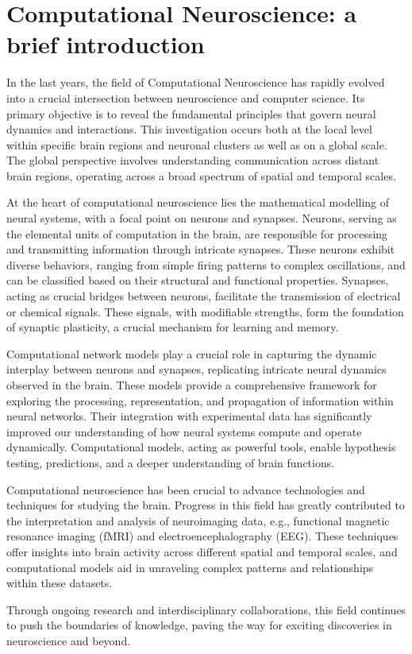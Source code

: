 \documentclass[../main.tex]{subfiles}
\begin{document}
\section{Computational Neuroscience: a brief introduction}
In the last years, the field of Computational Neuroscience has rapidly evolved into a crucial intersection between neuroscience and computer science.
Its primary objective is to reveal the fundamental principles that govern neural dynamics and interactions.
This investigation occurs both at the local level within specific brain regions and neuronal clusters as well as on a global scale.
The global perspective involves understanding communication across distant brain regions, operating across a broad spectrum of spatial and temporal scales.

At the heart of computational neuroscience lies the mathematical modelling of neural systems, with a focal point on neurons and synapses.
Neurons, serving as the elemental units of computation in the brain, are responsible for processing and transmitting information through intricate synapses.
These neurons exhibit diverse behaviors, ranging from simple firing patterns to complex oscillations, and can be classified based on their structural and functional properties.
Synapses, acting as crucial bridges between neurons, facilitate the transmission of electrical or chemical signals.
These signals, with modifiable strengths, form the foundation of synaptic plasticity, a crucial mechanism for learning and memory.

Computational network models play a crucial role in capturing the dynamic interplay between neurons and synapses, replicating intricate neural dynamics observed in the brain.
These models provide a comprehensive framework for exploring the processing, representation, and propagation of information within neural networks.
Their integration with experimental data has significantly improved our understanding of how neural systems compute and operate dynamically.
Computational models, acting as powerful tools, enable hypothesis testing, predictions, and a deeper understanding of brain functions.

Computational neuroscience has been crucial to advance technologies and techniques for studying the brain.
Progress in this field has greatly contributed to the interpretation and analysis of neuroimaging data, e.g., functional magnetic resonance imaging (fMRI) and electroencephalography (EEG).
These techniques offer insights into brain activity across different spatial and temporal scales, and computational models aid in unraveling complex patterns and relationships within these datasets.

Through ongoing research and interdisciplinary collaborations, this field continues to push the boundaries of knowledge, paving the way for exciting discoveries in neuroscience and beyond.
\end{document}
